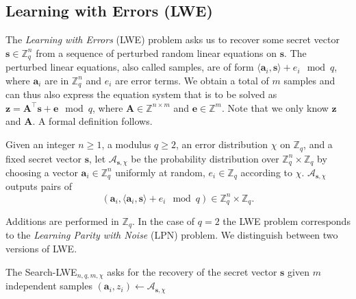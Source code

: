 \subsection{Learning with Errors (LWE)} \label{sec:lwe}
The \textit{Learning with Errors} (LWE) problem asks us to recover some secret vector $\mathbf{s} \in \mathbb{Z}_q^n$ from a sequence of perturbed random linear equations on $\mathbf{s}$. The perturbed linear equations, also called samples, are of form $\langle\mathbf{a}_i, \mathbf{s}\rangle + e_i \mod q$, where $\mathbf{a}_i$ are in $\mathbb{Z}_q^n$ and $e_i$ are error terms. We obtain a total of $m$ samples and can thus also express the equation system that is to be solved as $\mathbf{z} = \mathbf{A}^\intercal \mathbf{s} + \mathbf{e} \mod q$, where $\mathbf{A} \in \mathbb{Z}^{n \times m}$ and $\mathbf{e} \in \mathbb{Z}^m$. Note that we only know $\mathbf{z}$ and $\mathbf{A}$. A formal definition follows.

\begin{definition} %
    Given an integer $n \geq 1$, a modulus $q \geq 2$, an error distribution $\chi$ on $\mathbb{Z}_q$, and a fixed secret vector $\mathbf{s}$, let $\mathcal{A}_{\mathbf{s}, \chi}$ be the probability distribution over $\mathbb{Z}_q^n \times \mathbb{Z}_q$ by choosing a vector $\mathbf{a}_i \in \mathbb{Z}_q^n$ uniformly at random, $e_i \in \mathbb{Z}_q$ according to $\chi$.  $\mathcal{A}_{\mathbf{s}, \chi}$ outputs pairs of
    \begin{equation}
        (\mathbf{a}_i, \langle \mathbf{a}_i, \mathbf{s} \rangle + e_i \mod q) \in \mathbb{Z}_q^n \times \mathbb{Z}_q.
    \end{equation}
\end{definition}

Additions are performed in $\mathbb{Z}_q$. In the case of $q=2$ the LWE problem corresponds to the \textit{Learning Parity with Noise} (LPN) problem. %
We distinguish between two versions of LWE.

\begin{definition} %
    The Search-LWE$_{n, q, m, \chi}$ asks for the recovery of the secret vector $\mathbf{s}$ given $m$ independent samples $(\mathbf{a}_i, z_i) \leftarrow \mathcal{A}_{\mathbf{s}, \chi}$ %
\end{definition}

